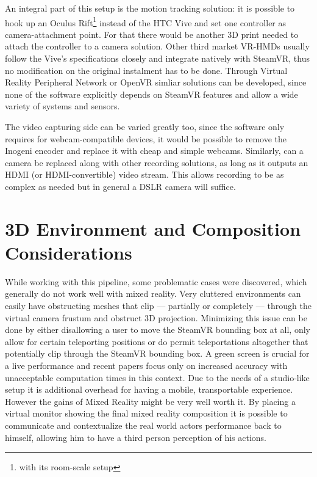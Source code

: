 An integral part of this setup is the motion tracking solution: it is possible 
to hook up an Oculus Rift\footnote{with its room-scale setup} instead of the 
HTC Vive and set one controller as camera-attachment point. For that there 
would be another 3D print needed to attach the controller to a camera solution. 
\newline
Other third market VR-HMDs usually follow the Vive's specifications closely and 
integrate natively with SteamVR, thus no modification on the original 
instalment has to be done.
\newline
Through Virtual Reality Peripheral Network or OpenVR simliar solutions can be 
developed, since none of the software explicitly depends on SteamVR features 
and allow a wide variety of systems and sensors.

The video capturing side can be varied greatly too, since the software only 
requires for webcam-compatible devices, it would be possible to remove 
the Inogeni encoder and replace it with cheap and simple webcams. Similarly, 
can a camera be replaced along with other recording solutions, as long as it 
outputs an HDMI (or HDMI-convertible) video stream. This allows recording to be 
as complex as needed but in general a DSLR camera will suffice.

\section{3D Environment and Composition Considerations}

While working with this pipeline, some problematic cases were discovered, which 
generally do not work well with mixed reality. Very cluttered environments can 
easily have obstructing meshes that clip --- partially or completely --- 
through the virtual camera frustum and obstruct 3D projection. Minimizing this 
issue can be done by either disallowing a user to move the SteamVR bounding box 
at all, only allow for certain teleporting positions or do permit 
teleportations altogether that potentially clip through the SteamVR bounding 
box.
\newline
A green screen is crucial for a live performance and recent papers focus only 
on increased accuracy with unacceptable computation times in this context. Due 
to the needs of a studio-like setup it is additional overhead for having a 
mobile, transportable experience. However the gains of Mixed Reality might be 
very well worth it. 
\newline
By placing a virtual monitor showing the final mixed reality composition it is 
possible to communicate and contextualize the real world actors performance 
back to himself, allowing him to have a third person perception of his actions.

